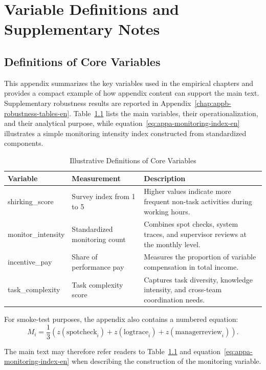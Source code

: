 \chapter{Variable Definitions and Supplementary Notes}
\label{chap:appa-variable-notes-en}

\section{Definitions of Core Variables}
\label{sec:appa-variable-definitions-en}

This appendix summarizes the key variables used in the empirical chapters and provides a compact example of how appendix content can support the main text. Supplementary robustness results are reported in Appendix~\ref{chap:appb-robustness-tables-en}. Table~\ref{tab:appa-core-variables-en} lists the main variables, their operationalization, and their analytical purpose, while equation~\eqref{eq:appa-monitoring-index-en} illustrates a simple monitoring intensity index constructed from standardized components.

\begin{table}[htbp]
    \centering
    \caption{Illustrative Definitions of Core Variables}
    \label{tab:appa-core-variables-en}
    \begin{tabular}{p{3.3cm}p{4.1cm}p{5.5cm}}
        \toprule
        Variable & Measurement & Description \\
        \midrule
        shirking\_score & Survey index from 1 to 5 & Higher values indicate more frequent non-task activities during working hours. \\
        monitor\_intensity & Standardized monitoring count & Combines spot checks, system traces, and supervisor reviews at the monthly level. \\
        incentive\_pay & Share of performance pay & Measures the proportion of variable compensation in total income. \\
        task\_complexity & Task complexity score & Captures task diversity, knowledge intensity, and cross-team coordination needs. \\
        \bottomrule
    \end{tabular}
\end{table}

For smoke-test purposes, the appendix also contains a numbered equation:
\begin{equation}
    \label{eq:appa-monitoring-index-en}
    M_i = \frac{1}{3}\left(z(\text{spotcheck}_i) + z(\text{logtrace}_i) + z(\text{managerreview}_i)\right).
\end{equation}

The main text may therefore refer readers to Table~\ref{tab:appa-core-variables-en} and equation~\eqref{eq:appa-monitoring-index-en} when describing the construction of the monitoring variable.
